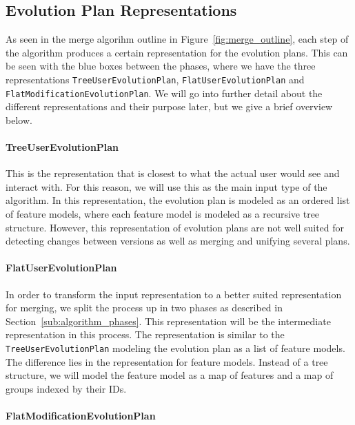 \documentclass[a4paper,english]{ifimaster}
\begin{document}
\subsection{Evolution Plan Representations}%
\label{sub:evolution_plan_representations}

As seen in the merge algorihm outline in Figure~\ref{fig:merge_outline}, each step of the algorithm produces a certain representation for the evolution plans. This can be seen with the blue boxes between the phases, where we have the three representations \texttt{Tree\-User\-Evolution\-Plan}, \texttt{Flat\-User\-Evolution\-Plan} and \texttt{Flat\-Modification\-Evolution\-Plan}. We will go into further detail about the different representations and their purpose later, but we give a brief overview below.

\paragraph{TreeUserEvolutionPlan}%
\label{par:treeuserevolutionplan}

This is the representation that is closest to what the actual user would see and interact with. For this reason, we will use this as the main input type of the algorithm. In this representation, the evolution plan is modeled as an ordered list of feature models, where each feature model is modeled as a recursive tree structure. However, this representation of evolution plans are not well suited for detecting changes between versions as well as merging and unifying several plans.

\paragraph{FlatUserEvolutionPlan}%
\label{par:flatuserevolutionplan}

In order to transform the input representation to a better suited representation for merging, we split the process up in two phases as described in Section~\vref{sub:algorithm_phases}. This representation will be the intermediate representation in this process. The representation is similar to the \texttt{Tree\-User\-Evolution\-Plan} modeling the evolution plan as a list of feature models. The difference lies in the representation for feature models. Instead of a tree structure, we will model the feature model as a map of features and a map of groups indexed by their IDs.

\paragraph{FlatModificationEvolutionPlan}%
\label{par:flatmodificationevolutionplan}
\end{document}
